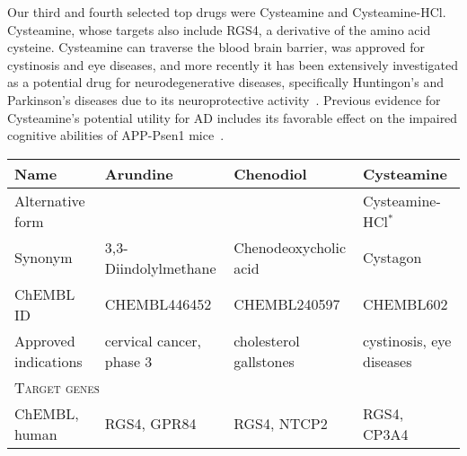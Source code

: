 \documentclass[letterpaper]{article}
\begin{document}
Our third and fourth selected top drugs were Cysteamine and Cysteamine-HCl.
Cysteamine, whose targets also include RGS4, a derivative of the amino acid
cysteine.  Cysteamine can traverse the blood brain barrier, was approved for
cystinosis and eye diseases, and more recently it has been extensively investigated as a potential drug for neurodegenerative diseases, specifically Huntingon's and Parkinson's diseases due to its neuroprotective activity~\citep{Besouw2013,Paul2019}.  Previous evidence for Cysteamine's potential utility for AD includes its favorable effect on the impaired
cognitive abilities of APP-Psen1 mice~\citep{Cicchetti2019}.

\begin{table}
\footnotesize
\begin{tabular}{p{} | p{} p{} p{}}
\toprule
                                              Name &                           Arundine &              Chenodiol &                          Cysteamine \\
\midrule
                                  Alternative form &
                                                   &                        & Cysteamine-HCl$^\ast$ \\
                                           Synonym &               3,3-Diindolylmethane &  Chenodeoxycholic acid &                            Cystagon \\
                                         ChEMBL ID &                       CHEMBL446452 &           CHEMBL240597 &                           CHEMBL602 \\
                              Approved indications &          cervical cancer, phase 3 & cholesterol gallstones &            cystinosis, eye diseases \\
\midrule
\multicolumn{4}{l}{\scshape Target genes} \\
                                     ChEMBL, human &                        RGS4, GPR84 &            RGS4, NTCP2 &                         RGS4, CP3A4 \\

\end{tabular}
\end{table}
\end{document}
